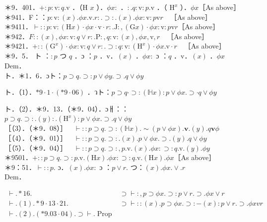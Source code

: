 \documentclass[10pt]{article}
\begin{document}
＊9．401．$+: p: \mathrm{v}: q . \mathrm{v}$ ．（H $x$ ）．$\phi x:$ ．$: . q: \mathrm{v}: p . \mathrm{v}$ ．（ $\mathrm{H}^{x}$ ）．$\phi x$［As above］\\
＊941．F：：$p: \mathrm{v}:(x) . \phi x . \mathrm{v} . r: . \supset: .(x) . \phi x: \mathrm{v}: p \mathrm{v} r \quad$［As above］\\
＊9411．$\vdash:: p: \mathrm{v}:(\mathrm{H} x) \cdot \phi x \cdot \mathrm{v} \cdot r: . \mathrm{J}:,(\mathrm{G} x) \cdot \phi x: \mathrm{v}: p \mathrm{v} r$［As above］\\
＊942．$F::(x), \phi x: \mathrm{v}: q \vee r: . \mathrm{P}:, q: \mathrm{v}:(x), \phi x, \mathrm{v}, r \quad$［As above］\\
＊9421．$+::\left(\mathrm{G}^{x}\right) \cdot \phi x: \mathrm{v}: q \vee r: . \supset: q: \mathrm{v}:\left(\mathrm{H}^{x}\right) \cdot \phi x . \mathrm{v} \cdot r \quad$［As above］\\
＊9．5． ト ：$: p$ つ $q$ ．ɔ ：$p$ ．v．$(x)$ ．$\phi x:$ ɔ ：$q$ ．v．$(x)$ ．$\phi x$\\
Dem．\\
ト．＊1．6．ɔト：$p \supset q . \supset: p \vee \phi y . \supset . q \vee \phi y$

ト．（1）．$* 9 \cdot 1 \cdot(* 9 \cdot 06)$ ．วト：$p \supset q \cdot \supset:(\mathbb{H} x): p \vee \phi x . \supset \cdot q \vee \phi y$

ト．（2）．＊9．13．（＊9．04）．ɔㅐ：：$p \supset q . \supset: .(y): .\left(\mathrm{H}^{x}\right): p \vee \phi x . \supset . q \vee \phi y$\\
［（3）．（＊9．08）］$\quad \vdash:: p \supset q . \supset:(\mathbb{H} x) . \sim(p \vee \phi x) . \mathbf{v} .(y) . q \mathbf{v} \phi$\\
［（4）．（＊9．01）］$\quad \vdash:: p \supset q . \supset: .(x) . p \vee \phi x . \supset .(y) . q \vee \phi y$\\
［（5）．（＊9．04）］$\quad \vdash:: p \supset q . \supset:, p . \mathrm{v} .(x) . \phi x: \supset: q . \mathrm{v} .(y) . \phi y$\\
＊9501．$+:: p \supset q . \supset: p . \mathrm{v} .(\mathrm{H} x) . \phi x: \supset: q . \mathrm{v} .(\mathrm{H} x) . \phi x$［As above］\\
＊9：51．$\vdash:: p$. ɔ．$(x) . \phi x:$ ɔ ：$p \vee r$. つ：$(x) . \phi x . \vee . r$\\
Dem．

\[
\begin{array}{ll}
\vdash . * 16 . & \supset \vdash:, p \supset \phi x . \supset: p \vee r . \supset . \phi x \vee r \\
\vdash .(1) . * 9 \cdot 13 \cdot 21 . & \supset \vdash::(x) . p \supset \phi x . \supset:-(x): p \vee r . \supset . \phi x v r  \tag{2}\\
\vdash .(2) .(* 9.03 \cdot 04) . \supset \vdash . \operatorname{Prop} &
\end{array}
\]
\end{document}
